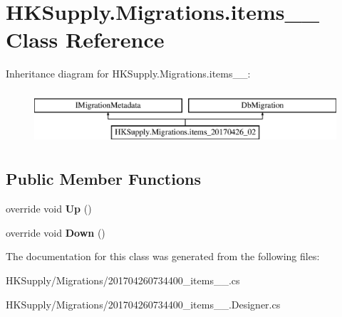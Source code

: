 \hypertarget{class_h_k_supply_1_1_migrations_1_1items__20170426__02}{}\section{H\+K\+Supply.\+Migrations.\+items\+\_\+\_ Class Reference}
\label{class_h_k_supply_1_1_migrations_1_1items__20170426__02}
Inheritance diagram for H\+K\+Supply.\+Migrations.\+items\+\_\+\_\+:\begin{figure}[H]
\begin{center}
\leavevmode
\includegraphics[height=2.000000cm]{class_h_k_supply_1_1_migrations_1_1items__20170426__02}
\end{center}
\end{figure}
\subsection*{Public Member Functions}
\begin{DoxyCompactItemize}
\item 
\mbox{\label{class_h_k_supply_1_1_migrations_1_1items__20170426__02_af6fb2163c2fa50a62095de9b83a89bcf}} 
override void {\bfseries Up} ()
\item 
\mbox{\label{class_h_k_supply_1_1_migrations_1_1items__20170426__02_ac4fe93dcc80d084d1be5e3a9668002b9}} 
override void {\bfseries Down} ()
\end{DoxyCompactItemize}


The documentation for this class was generated from the following files\+:\begin{DoxyCompactItemize}
\item 
H\+K\+Supply/\+Migrations/201704260734400\+\_\+items\+\_\+\_.\+cs\item 
H\+K\+Supply/\+Migrations/201704260734400\+\_\+items\+\_\+\_.\+Designer.\+cs\end{DoxyCompactItemize}
